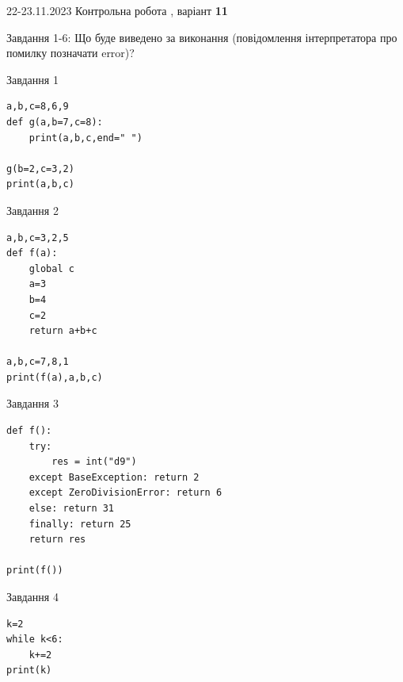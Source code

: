 \documentclass[12pt, ukrainian]{article}
\begin{document}
{{22-23.11.2023 Контрольна робота , варіант  \No \textbf { 11 }\par}}
{

Завдання 1-6: Що буде виведено за виконання (повідомлення інтерпретатора про помилку позначати error)?


\begin{minipage}[t]{9.7cm}                
{\begin{center}Завдання {1}\end{center}}
\begin{verbatim}
a,b,c=8,6,9
def g(a,b=7,c=8):
    print(a,b,c,end=" ")

g(b=2,c=3,2)
print(a,b,c)
\end{verbatim}     
\end{minipage}
\vline \hspace{8mm}
\begin{minipage}[t]{8.0cm}                
{\begin{center}Завдання {2}\end{center}}
\begin{verbatim}
a,b,c=3,2,5
def f(a):
    global c
    a=3
    b=4
    c=2
    return a+b+c

a,b,c=7,8,1
print(f(a),a,b,c)
\end{verbatim}     
\end{minipage}

\vspace{15mm}
\begin{minipage}[t]{9.7cm}                
{\begin{center}Завдання {3}\end{center}}
\begin{verbatim}
def f():
    try:
        res = int("d9")
    except BaseException: return 2
    except ZeroDivisionError: return 6
    else: return 31
    finally: return 25
    return res

print(f())
\end{verbatim}     
\end{minipage}
\vline \hspace{8mm}
\begin{minipage}[t]{8.0cm}                
{\begin{center}Завдання {4}\end{center}}
\begin{verbatim}
k=2
while k<6:
    k+=2
print(k)
\end{verbatim}     
\end{minipage}

}
\end{document}
